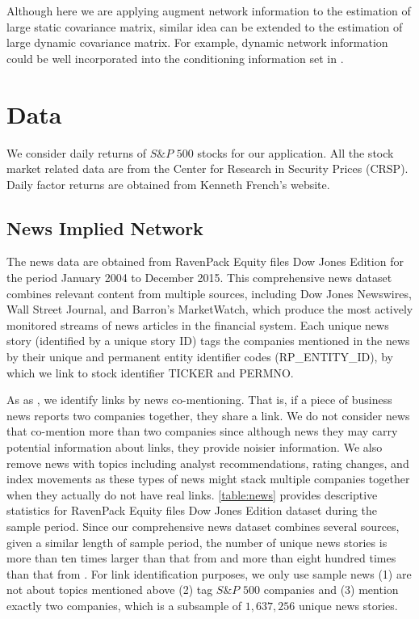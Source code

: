Although here we are applying augment network information to the estimation of large static covariance matrix, similar idea can be extended to the estimation of large dynamic covariance matrix. For example, dynamic network information could be well incorporated into the conditioning information set in \citet{chen2019new}.


\section{Data}
We consider daily returns of $S\& P$ $500$ stocks for our application. All the stock market related data are from the Center for Research in Security Prices (CRSP). Daily factor returns are obtained from Kenneth French’s website.
\subsection{News Implied Network}
The news data are obtained from RavenPack Equity files Dow Jones Edition for the period January 2004 to December 2015. This comprehensive news dataset combines relevant content from multiple sources, including Dow Jones Newswires, Wall Street Journal, and Barron's MarketWatch, which produce the most actively monitored streams of news articles in the financial system. Each unique news story (identified by a unique story ID) tags the companies mentioned in the news by their unique and permanent entity identifier codes (RP\_ENTITY\_ID),  by which we link to stock identifier TICKER and PERMNO.

As as \cite{ge2021news}, we identify links by news co-mentioning. That is, if a piece of business news reports two companies together, they share a link. We do not consider news that co-mention more than two companies since although news they may carry potential information about links, they provide noisier information. We also remove news with topics including analyst recommendations, rating changes, and index movements as these types of news might stack multiple companies together when they actually do not have real links. \autoref{table:news} provides descriptive statistics for RavenPack Equity files Dow Jones Edition dataset during the sample period. Since our comprehensive news dataset combines several sources, given a similar length of sample period, the number of unique news stories is more than ten times larger than that from \citet{scherbina2015economic} and more than eight hundred times than that from \citet{schwenkler2019network}. For link identification purposes, we only use sample news (1) are not about topics mentioned above (2) tag $S\& P$ $500$ companies and (3) mention exactly two companies, which is a subsample of $1,637,256$ unique news stories.


